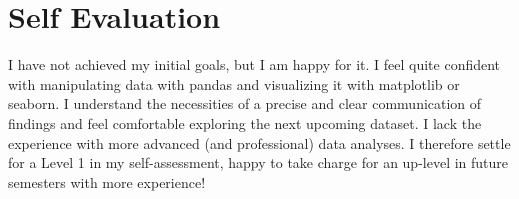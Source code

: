 \documentclass[a4paper]{article}
\begin{document}
\section{Self Evaluation}
I have not achieved my initial goals, but I am happy for it. I feel quite confident with manipulating data with pandas and visualizing it with matplotlib or seaborn. I understand the necessities of a precise and clear communication of findings and feel comfortable exploring the next upcoming dataset. I lack the experience with more advanced (and professional) data analyses. I therefore settle for a Level 1 in my self-assessment, happy to take charge for an up-level in future semesters with more experience!
\end{document}
